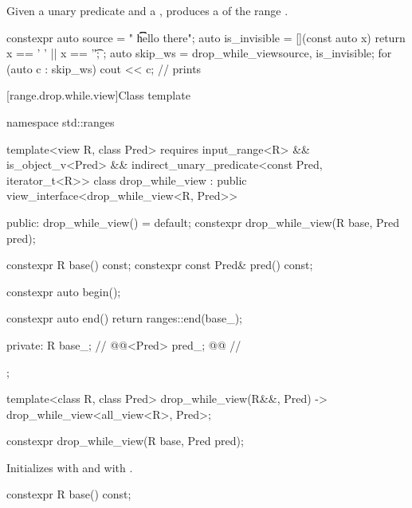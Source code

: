 \pnum
Given a unary predicate  and a  ,
 produces a 
of the range .

\pnum
\begin{example}
\begin{codeblock}
constexpr auto source = "  \t   \t   \t   hello there";
auto is_invisible = [](const auto x) { return x == ' ' || x == '\t'; };
auto skip_ws = drop_while_view{source, is_invisible};
for (auto c : skip_ws) {
  cout << c;                                    // prints 
}
\end{codeblock}
\end{example}

[range.drop.while.view]{Class template }

%
\begin{codeblock}
namespace std::ranges {
  template<view R, class Pred>
  requires input_range<R> && is_object_v<Pred> &&
    indirect_unary_predicate<const Pred, iterator_t<R>>
  class drop_while_view : public view_interface<drop_while_view<R, Pred>> {
  public:
    drop_while_view() = default;
    constexpr drop_while_view(R base, Pred pred);

    constexpr R base() const;
    constexpr const Pred& pred() const;

    constexpr auto begin();

    constexpr auto end()
    { return ranges::end(base_); }

  private:
    R base_;                                            // \expos
    @@<Pred> pred_; @\itcorr[-1]@                       // \expos
  };

  template<class R, class Pred>
    drop_while_view(R&&, Pred) -> drop_while_view<all_view<R>, Pred>;
}
\end{codeblock}

%
\begin{itemdecl}
constexpr drop_while_view(R base, Pred pred);
\end{itemdecl}

\begin{itemdescr}
\pnum
\effects
Initializes  with  and
 with .
\end{itemdescr}

%
\begin{itemdecl}
constexpr R base() const;
\end{itemdecl}


